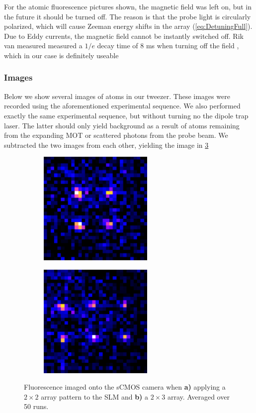 For the atomic fluorescence pictures shown, the magnetic field was left on, but in the future it should be turned off. 
The reason is that the probe light is circularly polarized, which will cause Zeeman energy shifts in the array (\cref{eq:DetuningFull}).  
Due to Eddy currents, the magnetic field cannot be instantly switched off. 
Rik van measured measured a $1/e$ decay time of 8 ms when turning off the field \cite{Herk2022}, which in our case is definitely useable 


\subsubsection*{Images}

Below we show several images of atoms in our tweezer. 
These images were recorded using the aforementioned experimental sequence. 
We also performed exactly the same experimental sequence, but without turning no the dipole trap laser. 
The latter should only yield background as a result of atoms remaining from the expanding MOT or scattered photons from the probe beam. 
We subtracted the two images from each other, yielding the image in \cref{fig:fluorescence}


\begin{figure}
    \centering
	\begin{subfigure}{.49\linewidth}
		\centering
		\includegraphics[height=5.5cm]{figures/2x2fluorescence.pdf}
		\caption{}
		\label{fig:fluor2x2}
	\end{subfigure}
	\hfill
	\begin{subfigure}{.49\linewidth}
		\centering
		\includegraphics[height=5.5cm]{figures/2x3fluorescence.pdf}
		\caption{}
		\label{fig:fluor2x3}
	\end{subfigure}
	\caption{
	Fluorescence imaged onto the sCMOS camera when \textsf{\textbf{a)}} applying a $2\times2$ array pattern to the SLM and \textsf{\textbf{b)}} a $2\times 3$ array.
	Averaged over 50 runs.
    }
    \label{fig:fluorescence}
\end{figure}

